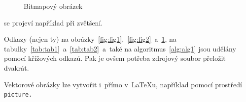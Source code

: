\documentclass[a4paper, 11pt]{article}
\begin{document}
\begin{figure}[h]
    \centering
    \caption{Bitmapový obrázek}
    \label{fig:fig3}
\end{figure}
\bigskip\noindent se projeví například při zvětšení.

Odkazy (nejen ty) na obrázky~\ref{fig:fig1},~\ref{fig:fig2}~a~\ref{fig:fig3}, na tabulky~\ref{tab:tab1}~a~\ref{tab:tab2}~a~také na algoritmus~\ref{alg:alg1} jsou udělány pomocí křížových odkazů. Pak je ovšem potřeba zdrojový soubor přeložit dvakrát.

Vektorové obrázky lze vytvořit i~přímo v~\LaTeX u, například pomocí prostředí\texttt{ picture.}
\pagebreak
\end{document}
